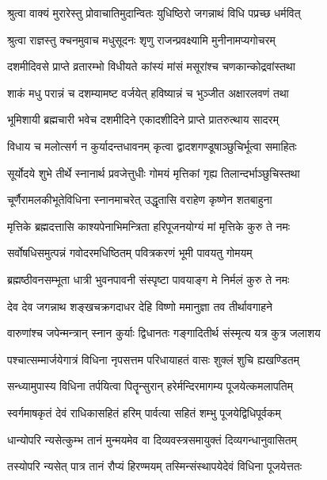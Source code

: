 \twolineshloka
{श्रुत्वा वाक्यं मुरारेस्तु प्रोवाचातिमुदान्वितः}
{युधिष्ठिरो जगन्नाथं विधि पप्रच्छ धर्मवित्} %

\twolineshloka
{श्रुत्वा राज्ञस्तु क्चनमुवाच मधुसूदनः}
{शृणु राजन्प्रवक्ष्यामि मुनीनामप्यगोचरम्} %

\twolineshloka
{दशमीदिवसे प्राप्ते व्रतारम्भो विधीयते}
{कांस्यं मांसं मसूरांश्च चणकान्कोद्रवांस्तथा} %

\twolineshloka
{शाकं मधु परान्नं च दशम्यामष्ट वर्जयेत्}
{हविष्यान्नं च भुञ्जीत अक्षारलवणं तथा} %

\twolineshloka
{भूमिशायी ब्रह्मचारी भवेच दशमीदिने}
{एकादशीदिने प्राप्ते प्रातरुत्थाय सादरम्} %

\twolineshloka
{विधाय च मलोत्सर्ग न कुर्यादन्तधावनम्}
{कृत्वा द्वादशगण्डूषाञ्छुचिर्भूत्वा समाहितः} %

\twolineshloka
{सूर्योदये शुभे तीर्थे स्नानार्थ प्रवजेत्तुधीः}
{गोमयं मृत्तिकां गृह्य तिलान्दर्भाञ्छुचिस्तथा} %

\twolineshloka
{चूर्णैरामलकीभूतेविधिना स्नानमाचरेत्}
{उद्धृतासि वराहेण कृष्णेन शतबाहुना} %

\twolineshloka
{मृत्तिके ब्रह्मदत्तासि काश्यपेनाभिमन्त्रिता}
{हरिपूजनयोग्यं मां मृत्तिके कुरु ते नमः} %

\twolineshloka
{सर्वोषधिसमुत्पन्नं गवोदरमधिष्ठितम्}
{पवित्रकरणं भूमी पावयतु गोमयम्} %

\twolineshloka
{ब्रह्मष्ठीवनसम्भूता धात्री भुवनपावनी}
{संस्पृष्टा पावयाङ्ग मे निर्मलं कुरु ते नमः} %

\twolineshloka
{देव देव जगन्नाथ शङ्खचक्रगदाधर}
{देहि विष्णो ममानुज्ञा तव तीर्थावगाहने} %

\twolineshloka
{वारुणांश्च जपेन्मन्त्रान् स्नान कुर्याः द्विधानतः}
{गङ्गादितीर्थ संस्मृत्य यत्र कुत्र जलाशय} %

\twolineshloka
{पश्चात्सम्मार्जयेगात्रं विधिना नृपसत्तम}
{परिधायाहतं वासः शुक्लं शुचि ह्यखण्डितम्} %

\twolineshloka
{सन्ध्यामुपास्य विधिना तर्पयित्वा पितॄन्सुरान्}
{हरेर्मन्दिरमागम्य पूजयेत्कमलापतिम्} %

\twolineshloka
{स्वर्गमाषकृतं देवं राधिकासहितं हरिम्}
{पार्वत्या सहितं शम्भु पूजयेद्विधिपूर्वकम्} %

\twolineshloka
{धान्योपरि न्यसेत्कुम्भ तानं मुन्मयमेव वा}
{दिव्यवस्त्रसमायुक्तं दिव्यगन्धानुवासितम्} %

\twolineshloka
{तस्योपरि न्यसेत् पात्र तानं रौप्यं हिरण्मयम्}
{तस्मिन्संस्थापयेदेवं विधिना पूजयेत्ततः} %

